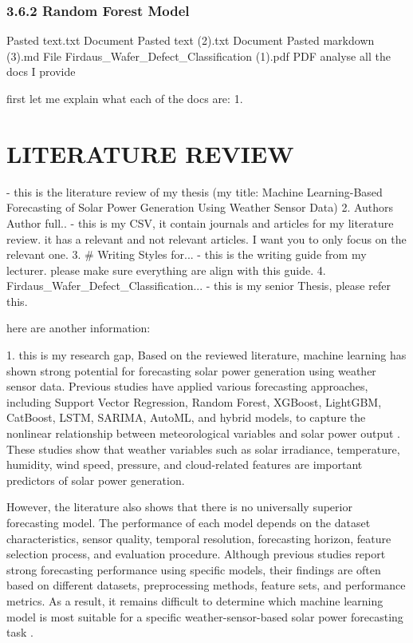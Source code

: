 \subsection{3.6.2 Random Forest Model}

Pasted text.txt
Document
Pasted text (2).txt
Document
Pasted markdown (3).md
File
Firdaus_Wafer_Defect_Classification (1).pdf
PDF
analyse all the docs I provide

first let me explain what each of the docs are:
1. \chapter{LITERATURE REVIEW} - this is the literature review of my thesis (my title: Machine Learning-Based Forecasting of Solar Power Generation Using Weather Sensor Data)
2. Authors Author full.. - this is my CSV, it contain journals and articles for my literature review. it has a relevant and not relevant articles. I want you to only focus on the relevant one.
3. # Writing Styles for... - this is the writing guide from my lecturer. please make sure everything are align with this guide.
4. Firdaus_Wafer_Defect_Classification... - this is my senior Thesis, please refer this.

here are another information:

1. this is my research gap,
Based on the reviewed literature, machine learning has shown strong potential for forecasting solar power generation using weather sensor data. Previous studies have applied various forecasting approaches, including Support Vector Regression, Random Forest, XGBoost, LightGBM, CatBoost, LSTM, SARIMA, AutoML, and hybrid models, to capture the nonlinear relationship between meteorological variables and solar power output \parencite{JnanaVarshitha2025, Bakht2025, Eren2025, ArellanosTafur2025, Alhassan2025}. These studies show that weather variables such as solar irradiance, temperature, humidity, wind speed, pressure, and cloud-related features are important predictors of solar power generation.

However, the literature also shows that there is no universally superior forecasting model. The performance of each model depends on the dataset characteristics, sensor quality, temporal resolution, forecasting horizon, feature selection process, and evaluation procedure. Although previous studies report strong forecasting performance using specific models, their findings are often based on different datasets, preprocessing methods, feature sets, and performance metrics. As a result, it remains difficult to determine which machine learning model is most suitable for a specific weather-sensor-based solar power forecasting task \parencite{TsaiLo2025, Alhassan2025, CarvalhoJunior2025}.


